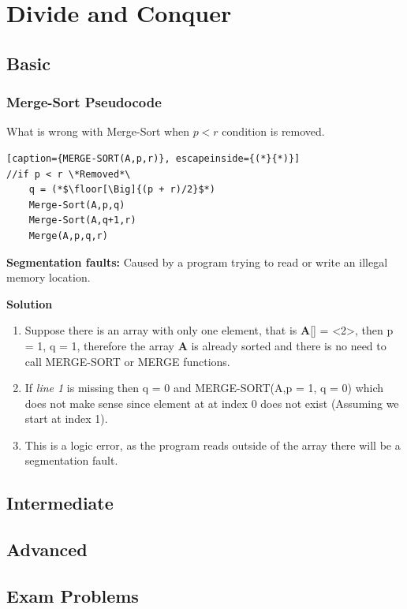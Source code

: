 \documentclass[11pt,fleqn]{book}
\DeclarePairedDelimiter{\floor}{\lfloor}{\rfloor}
\begin{document}
\chapter{Divide and Conquer}
\section{Basic}
\vspace{1em}
\subsection{Merge-Sort Pseudocode} 
\begin{example}
What is wrong with Merge-Sort when $p < r$ condition is removed. 
\begin{lstlisting}[caption={MERGE-SORT(A,p,r)}, escapeinside={(*}{*)}]
//if p < r \*Removed*\
    q = (*$\floor[\Big]{(p + r)/2}$*)
    Merge-Sort(A,p,q)
    Merge-Sort(A,q+1,r)
    Merge(A,p,q,r)
\end{lstlisting}
\end{example}
\begin{definition}
\textbf{Segmentation faults:}  Caused by a program trying to read or write an illegal memory location.
\end{definition}
\textbf{Solution}\\
\begin{enumerate}
    \item Suppose there is an array with only one element, that is \textbf{A}[] = <2>, then p = 1, q = 1, therefore the array \textbf{A} is already sorted and there is no need to call MERGE-SORT or MERGE functions. 
    \item  If \textit{line 1} is missing then q = 0 and MERGE-SORT(A,p = 1, q = 0) which does not make sense since element at at index 0 does not exist (Assuming we start at index 1). 
    \item This is a logic error, as the program reads outside of the array there will be a segmentation fault.  
\end{enumerate}
\section{Intermediate}
\section{Advanced}
\section{Exam Problems}
\end{document}
